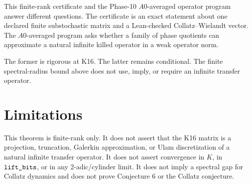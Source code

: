 \documentclass[11pt,a4paper]{article}
\newcommand{\ttbr}[1]{\ifmmode\text{\texttt{\detokenize{#1}}}\else\texttt{\detokenize{#1}}\fi}
\begin{document}
This finite-rank certificate and the Phase-10 \(A0\)-averaged operator
program answer different questions.  The certificate is an exact
statement about one declared finite substochastic matrix and a
Lean-checked Collatz--Wielandt vector.  The \(A0\)-averaged program asks
whether a family of phase quotients can approximate a natural infinite
killed operator in a weak operator norm.

The former is rigorous at K16.  The latter remains conditional.  The
finite spectral-radius bound above does not use, imply, or require an
infinite transfer operator.

\section{Limitations}

This theorem is finite-rank only.  It does not assert that the K16 matrix
is a projection, truncation, Galerkin approximation, or Ulam
discretization of a natural infinite transfer operator.  It does not
assert convergence in \(K\), in \(\ttbr{lift_bits}\), or in any
2-adic/cylinder limit.  It does not imply a spectral gap for Collatz
dynamics and does not prove Conjecture 6 or the Collatz conjecture.
\end{document}
